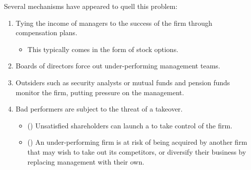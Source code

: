 \documentclass[notoc,notitlepage]{tufte-book}
\begin{document}
Several mechanisms have appeared to quell this problem:
\begin{enumerate}
  \item Tying the income of managers to the success of the firm through
    compensation plans.
    \begin{itemize}
      \item This typically comes in the form of stock options.
    \end{itemize}
  \item Boards of directors force out under-performing management teams.
  \item Outsiders such as security analysts or mutual funds and pension funds
    monitor the firm, putting pressure on the management.
  \item Bad performers are subject to the threat of a takeover.
    \begin{itemize}
      \item () Unsatisfied shareholders
        can launch a  to take control of the firm.
      \item () An under-performing firm is at risk
        of being acquired by another firm that may wish to take out its
        competitors, or diversify their business by replacing management
        with their own.
    \end{itemize}
\end{enumerate}




\appendix

\backmatter

\fancyhead[LE]{\thepage \enspace \textsl{\leftmark}}



\printindex
\end{document}

